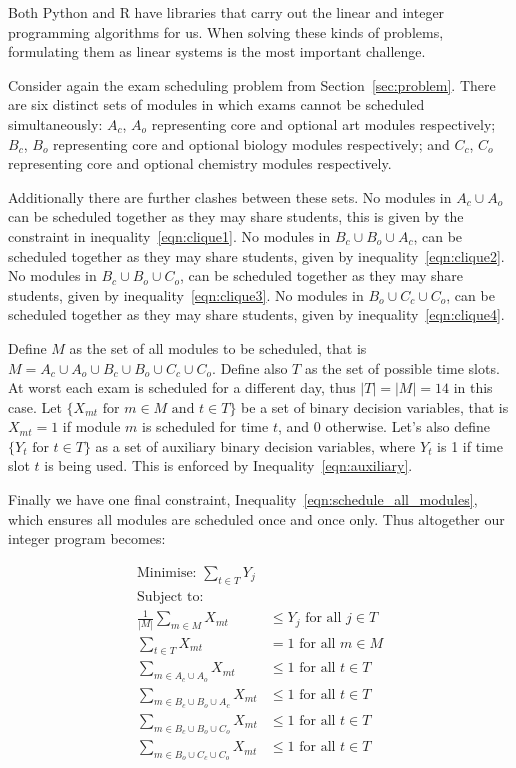 Both Python and R have libraries that carry out the linear and integer
programming algorithms for us. When solving these kinds of problems, formulating
them as linear systems is the most important challenge.

Consider again the exam scheduling problem from Section~\ref{sec:problem}.
There are six distinct sets of modules in which exams cannot be scheduled
simultaneously: $A_c$, $A_o$ representing core and optional art modules
respectively; $B_c$, $B_o$ representing core and optional biology modules
respectively; and $C_c$, $C_o$ representing core and optional chemistry modules
respectively.

Additionally there are further clashes between these sets.
No modules in $A_c \cup A_o$ can be scheduled together as they may share
students, this is given by the constraint in inequality~\ref{eqn:clique1}.
No modules in $B_c \cup B_o \cup A_c$, can be scheduled together as they may
share students, given by inequality~\ref{eqn:clique2}.
No modules in $B_c \cup B_o \cup C_o$, can be scheduled together as they may
share students, given by inequality~\ref{eqn:clique3}.
No modules in $B_o \cup C_c \cup C_o$, can be scheduled together as they may
share students, given by inequality~\ref{eqn:clique4}.

Define $M$ as the set of all modules to be scheduled, that is
$M = A_c \cup A_o \cup B_c \cup B_o \cup C_c \cup C_o$.
Define also $T$ as the set of possible time slots. At worst each exam is
scheduled for a different day, thus $|T| = |M| = 14$ in this case.
Let $\{X_{mt} \text{ for } m \in M \text{ and } t \in T\}$ be a set of binary
decision variables, that is $X_{mt} = 1$ if module $m$ is scheduled for time
$t$, and $0$ otherwise.
Let's also define $\{Y_t \text{ for } t \in T\}$ as a set of auxiliary binary
decision variables, where $Y_t$ is 1 if time slot $t$ is being used. This is
enforced by Inequality~\ref{eqn:auxiliary}.

Finally we have one final constraint, Inequality~\ref{eqn:schedule_all_modules},
which ensures all modules are scheduled once and once only.
Thus altogether our integer program becomes:

\begin{align}
\text{Minimise: } \sum_{t \in T} Y_j & \\\label{eqn:objective}
\text{Subject to: } & \nonumber \\
\frac{1}{|M|} \sum_{m \in M} X_{mt} &\leq Y_j \text{ for all } j \in T\\\label{eqn:auxiliary}
\sum_{t \in T} X_{mt} &= 1 \text{ for all } m \in M\\\label{eqn:schedule_all_modules}
\sum_{m \in A_c \cup A_o} X_{mt} &\leq 1 \text{ for all } t \in T\\\label{eqn:clique1}
\sum_{m \in B_c \cup B_o \cup A_c} X_{mt} &\leq 1 \text{ for all } t \in T\\\label{eqn:clique2}
\sum_{m \in B_c \cup B_o \cup C_o} X_{mt} &\leq 1 \text{ for all } t \in T\\\label{eqn:clique3}
\sum_{m \in B_o \cup C_c \cup C_o} X_{mt} &\leq 1 \text{ for all } t \in T\\\label{eqn:clique4}
\end{align}

